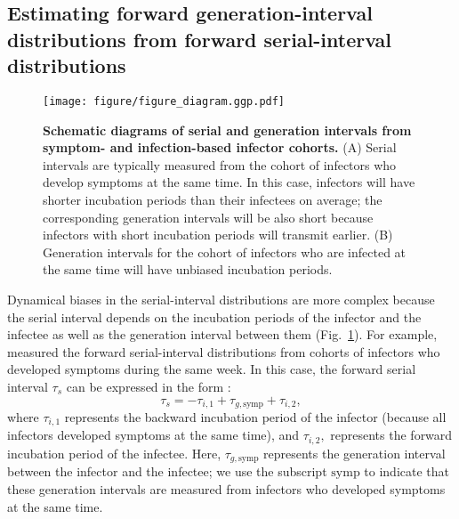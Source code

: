 \documentclass[12pt]{article}
\newcommand{\fref}[1]{Fig.~\ref{fig:#1}}
\begin{document}
\subsection{Estimating forward generation-interval distributions from forward serial-interval distributions}

\begin{figure}[!tp]
\texttt{[image: figure/figure\_diagram.ggp.pdf]}
\caption{
\textbf{Schematic diagrams of serial and generation intervals from symptom- and infection-based infector cohorts.}
(A) Serial intervals are typically measured from the cohort of infectors who develop symptoms at the same time. 
In this case, infectors will have shorter incubation periods than their infectees on average; the corresponding generation intervals will be also short because infectors with short incubation periods will transmit earlier.
(B) Generation intervals for the cohort of infectors who are infected at the same time will have unbiased incubation periods.
\label{fig:diagram}
}
\end{figure}

Dynamical biases in the serial-interval distributions are more complex because the serial interval depends on the incubation periods of the infector and the infectee as well as the generation interval between them (\fref{diagram}).
For example, \cite{backer2021omicron} measured the forward serial-interval distributions from cohorts of infectors who developed symptoms during the same week.
In this case, the forward serial interval $\tau_s$ can be expressed in the form \citep{park2021forward}:
\begin{equation}
\tau_s =  - \tau_{i, 1} + \tau_{g, \mathrm{symp}} + \tau_{i, 2},
\label{eq:serial}
\end{equation}
where $\tau_{i, 1}$ represents the backward incubation period of the infector (because all infectors developed symptoms at the same time), and $\tau_{i, 2},$ represents the forward incubation period of the infectee.
Here, $\tau_{g, \mathrm{symp}}$ represents the generation interval between the infector and the infectee; we use the subscript $\mathrm{symp}$ to indicate that these generation intervals are measured from infectors who developed symptoms at the same time.
\end{document}

